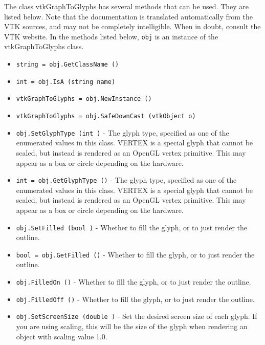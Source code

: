 The class vtkGraphToGlyphs has several methods that can be used.
  They are listed below.
Note that the documentation is translated automatically from the VTK sources,
and may not be completely intelligible.  When in doubt, consult the VTK website.
In the methods listed below, \verb|obj| is an instance of the vtkGraphToGlyphs class.
\begin{itemize}
\item  \verb|string = obj.GetClassName ()|

\item  \verb|int = obj.IsA (string name)|

\item  \verb|vtkGraphToGlyphs = obj.NewInstance ()|

\item  \verb|vtkGraphToGlyphs = obj.SafeDownCast (vtkObject o)|

\item  \verb|obj.SetGlyphType (int )| -  The glyph type, specified as one of the enumerated values in this
 class. VERTEX is a special glyph that cannot be scaled, but instead
 is rendered as an OpenGL vertex primitive. This may appear as a box
 or circle depending on the hardware.

\item  \verb|int = obj.GetGlyphType ()| -  The glyph type, specified as one of the enumerated values in this
 class. VERTEX is a special glyph that cannot be scaled, but instead
 is rendered as an OpenGL vertex primitive. This may appear as a box
 or circle depending on the hardware.

\item  \verb|obj.SetFilled (bool )| -  Whether to fill the glyph, or to just render the outline.

\item  \verb|bool = obj.GetFilled ()| -  Whether to fill the glyph, or to just render the outline.

\item  \verb|obj.FilledOn ()| -  Whether to fill the glyph, or to just render the outline.

\item  \verb|obj.FilledOff ()| -  Whether to fill the glyph, or to just render the outline.

\item  \verb|obj.SetScreenSize (double )| -  Set the desired screen size of each glyph. If you are using scaling,
 this will be the size of the glyph when rendering an object with
 scaling value 1.0.


\end{itemize}
